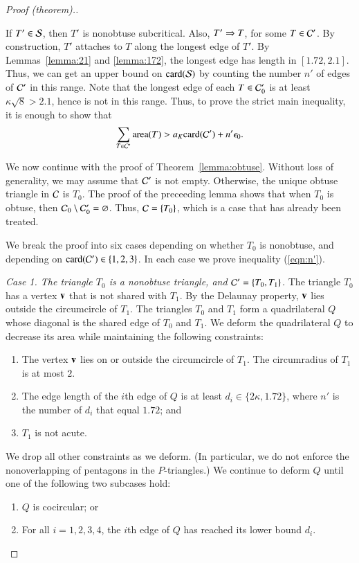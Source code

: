 \begin{proof}[Proof (theorem).]
\begin{remark} If $T'\in\S$, then $T'$ is nonobtuse subcritical.
  Also, $T'\Ra T$, for some $T\in \C'$.  By construction, $T'$
  attaches to $T$ along the longest edge of $T'$.  By
  Lemmas~\ref{lemma:21} and \ref{lemma:172}, the longest edge has
  length in $[1.72,2.1]$.  Thus, we can get an upper bound on
  $\card(\S)$ by counting the number $n'$ of edges of $\C'$ in this
  range.  Note that the longest edge of each $T\in \C_0'$ is at least
  $\kappa\sqrt8 > 2.1$, hence is not in this range.  Thus, to prove the
  strict main inequality, it is enough to show that
\begin{equation}\label{eqn:n'}
\sum_{T\in \C'} \area(T) > a_K \card(\C') + n'\epso.
\end{equation}
\end{remark}

We now continue with the proof of Theorem~\ref{lemma:obtuse}.  
Without loss of generality, we may assume that
$\C'$ is not empty.  Otherwise, the unique obtuse
triangle in $\C$ is $T_0$.  The proof of the preceeding lemma shows
that when $T_0$ is obtuse, then $\C_0 \setminus \C_0' = \emptyset$.
Thus, $\C = \{T_0\}$, which is a case that has already been treated.

We break the proof into six cases depending on whether $T_0$ is
nonobtuse, and depending on $\card(\C')\in \{1,2,3\}$.
In each case we prove inequality (\ref{eqn:n'}).


{\it Case 1. The triangle $T_0$ is a nonobtuse triangle, and
  $\C'=\{T_0,T_1\}$.}  The triangle $T_0$ has a vertex $\v$ that is
not shared with $T_1$.  By the Delaunay property, $\v$ lies outside
the circumcircle of $T_1$.  The triangles $T_0$ and $T_1$ form a
quadrilateral $Q$ whose diagonal is the shared edge of $T_0$ and
$T_1$.  We deform the quadrilateral $Q$ to decrease its area while
maintaining the following constraints:
\begin{enumerate}
\item The vertex $\v$ lies on or outside the circumcircle of
  $T_1$. The circumradius of $T_1$ is at most $2$.
\item The edge length of the $i$th edge of $Q$ is at least
  $d_i\in\{2\kappa,1.72\}$,
where $n'$ is the number of $d_i$ that equal $1.72$; and
\item $T_1$ is not acute.
\end{enumerate}
We drop all other constraints as we deform. (In particular, we do not
enforce the nonoverlapping of pentagons in the $P$-triangles.)
We continue to deform $Q$ until one of the following two subcases hold:
\begin{enumerate}
\item $Q$ is cocircular; or
\item For all $i=1,2,3,4$, the $i$th edge of $Q$ has reached its lower
  bound $d_i$.
\end{enumerate}


\end{proof}
